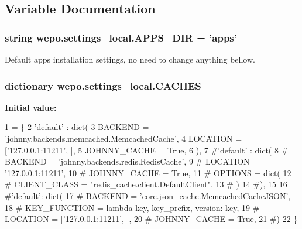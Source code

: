\subsection{Variable Documentation}
\hypertarget{namespacewepo_1_1settings__local_a75935e5d1b35b2475ca23bd142553a2f}{
\subsubsection[{A\-P\-P\-S\-\_\-\-D\-I\-R}]{\setlength{\rightskip}{0pt plus 5cm}string wepo.\-settings\-\_\-local.\-A\-P\-P\-S\-\_\-\-D\-I\-R = 'apps'}}\label{namespacewepo_1_1settings__local_a75935e5d1b35b2475ca23bd142553a2f}


Default apps installation settings, no need to change anything bellow. 

\hypertarget{namespacewepo_1_1settings__local_a8d75a3f9cf538fd56aebc0439129325d}{
\subsubsection[{C\-A\-C\-H\-E\-S}]{\setlength{\rightskip}{0pt plus 5cm}dictionary wepo.\-settings\-\_\-local.\-C\-A\-C\-H\-E\-S}}\label{namespacewepo_1_1settings__local_a8d75a3f9cf538fd56aebc0439129325d}
{\bfseries Initial value\-:}
\begin{DoxyCode}
1 = \{
2    \textcolor{stringliteral}{'default'} : dict(
3       BACKEND = \textcolor{stringliteral}{'johnny.backends.memcached.MemcachedCache'},
4       LOCATION = [\textcolor{stringliteral}{'127.0.0.1:11211'}, ],
5       JOHNNY\_CACHE = \textcolor{keyword}{True},
6    ),
7    \textcolor{comment}{#'default' : dict(}
8    \textcolor{comment}{#   BACKEND = 'johnny.backends.redis.RedisCache',}
9    \textcolor{comment}{#   LOCATION = '127.0.0.1:11211',}
10    \textcolor{comment}{#   JOHNNY\_CACHE = True,}
11    \textcolor{comment}{#   OPTIONS = dict(}
12    \textcolor{comment}{#      CLIENT\_CLASS = "redis\_cache.client.DefaultClient",}
13    \textcolor{comment}{#   )}
14    \textcolor{comment}{#),}
15 
16    \textcolor{comment}{#'default': dict(}
17    \textcolor{comment}{#   BACKEND = 'core.json\_cache.MemcachedCacheJSON',}
18    \textcolor{comment}{#   KEY\_FUNCTION = lambda key, key\_prefix, version: key,}
19    \textcolor{comment}{#   LOCATION = ['127.0.0.1:11211', ],}
20    \textcolor{comment}{#   JOHNNY\_CACHE = True,}
21    \textcolor{comment}{#)}
22 \}
\end{DoxyCode}


